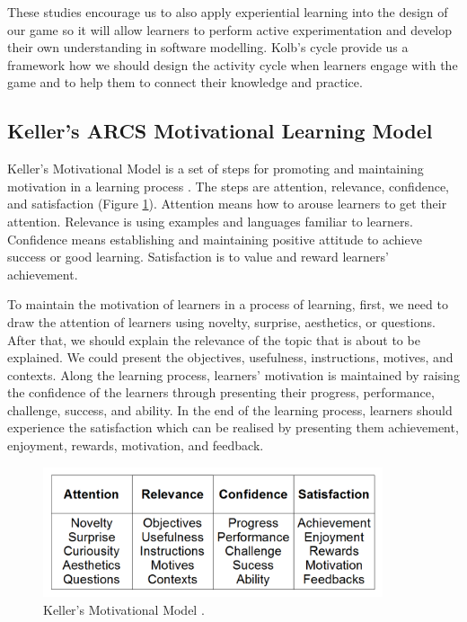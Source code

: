 \documentclass[12pt, a4paper]{report}
\begin{document}
These studies encourage us to also apply experiential learning into the design of our game so it will allow learners to perform active experimentation and develop their own understanding in software modelling. Kolb's cycle provide us a framework how we should design the activity cycle when learners engage with the game and to help them to connect their knowledge and practice.    
  
\subsection{Keller's ARCS Motivational Learning Model}
Keller's Motivational Model is a set of steps for promoting and maintaining motivation in a learning process \cite{keller2010motivational}. The steps are attention, relevance, confidence, and satisfaction (Figure \ref{keller}). Attention means how to arouse learners to get their attention. Relevance is using  examples and languages familiar to learners. Confidence means establishing and maintaining positive attitude to achieve success or good learning. Satisfaction is to value and reward learners' achievement.   

To maintain the motivation of learners in a process of learning, first, we need to draw the attention of learners using novelty, surprise, aesthetics, or questions. After that, we should explain the relevance of the topic that is about to be explained. We could present the objectives, usefulness, instructions, motives, and contexts. Along the learning process, learners' motivation is maintained by raising the confidence of the learners through presenting their progress, performance, challenge, success, and ability. In the end of the learning process, learners should experience the satisfaction which can be realised by presenting them achievement, enjoyment, rewards, motivation, and feedback.

\begin{figure}[ht]
\centering
\includegraphics[width=10cm]{keller}
\caption{Keller's Motivational Model \cite{keller2010motivational}.}
\label{keller}
\end{figure}
\end{document}
